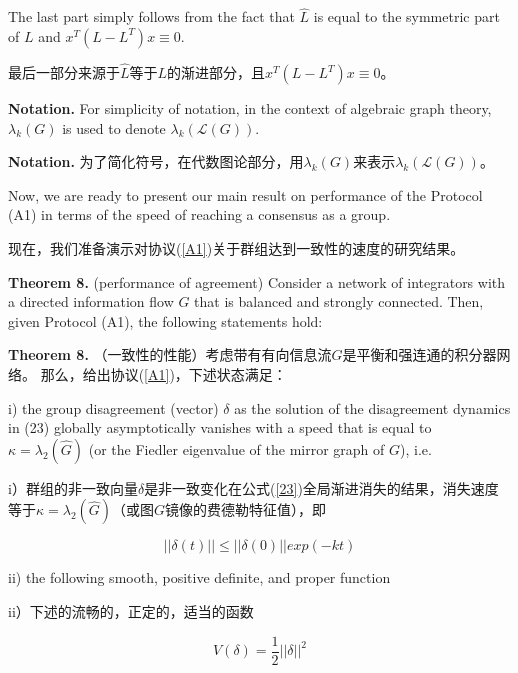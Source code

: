 \documentclass{article}
\begin{document}
{\color[gray]{0.5}
\noindent The last part simply follows from the fact that $\hat{L}$ is equal to the symmetric part of $L$ and $x^T(L-L^T)x\equiv0$.
}

\noindent 最后一部分来源于$\hat{L}$等于$L$的渐进部分，且$x^T(L-L^T)x\equiv0$。

{\color[gray]{0.5}
\noindent\textbf{Notation.} For simplicity of notation, in the context of algebraic graph theory, $\lambda_k(G)$ is used to denote $\lambda_k(\mathcal{L}(G))$.
}

\noindent\textbf{Notation.} 为了简化符号，在代数图论部分，用$\lambda_k(G)$来表示$\lambda_k(\mathcal{L}(G))$。

{\color[gray]{0.5}
Now, we are ready to present our main result on performance of the Protocol (A1) in terms of the speed of reaching a consensus as a group.
}

现在，我们准备演示对协议(\ref{A1})关于群组达到一致性的速度的研究结果。

{\color[gray]{0.5}
\noindent\textbf{Theorem 8.} (performance of agreement) Consider a network of integrators with a directed information ﬂow $G$ that is balanced and strongly connected. 
Then, given Protocol (A1), the following statements hold:
}

\noindent\textbf{Theorem 8.} （一致性的性能）考虑带有有向信息流$G$是平衡和强连通的积分器网络。
那么，给出协议(\ref{A1})，下述状态满足：

{\color[gray]{0.5}
i) the group disagreement (vector) $\delta$ as the solution of the disagreement dynamics in (23) globally asymptotically vanishes with a speed that is equal to $\kappa=\lambda_2(\hat{G})$ (or the Fiedler eigenvalue of the mirror graph of $G$), i.e.
}

i）群组的非一致向量$\delta$是非一致变化在公式(\ref{23})全局渐进消失的结果，消失速度等于$\kappa=\lambda_2(\hat{G})$（或图$G$镜像的费德勒特征值），即

\begin{equation}
    \tag{27}
    \label{27}
    ||\delta(t)||\le ||\delta(0)||exp(-kt)
\end{equation}

{\color[gray]{0.5}
ii) the following smooth, positive deﬁnite, and proper function
}

ii）下述的流畅的，正定的，适当的函数

\begin{equation}
    \tag{28}
    \label{28}
    V(\delta) = \frac{1}{2}||\delta||^2
\end{equation}
\end{document}
